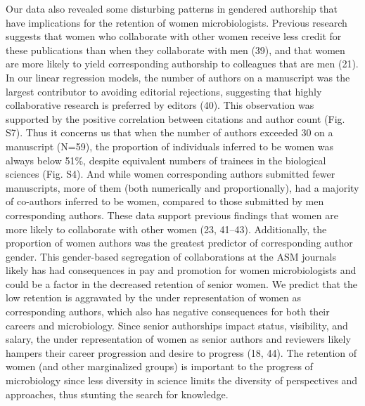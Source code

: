 \documentclass[11pt,]{article}
\begin{document}
Our data also revealed some disturbing patterns in gendered authorship
that have implications for the retention of women microbiologists.
Previous research suggests that women who collaborate with other women
receive less credit for these publications than when they collaborate
with men (39), and that women are more likely to yield corresponding
authorship to colleagues that are men (21). In our linear regression
models, the number of authors on a manuscript was the largest
contributor to avoiding editorial rejections, suggesting that highly
collaborative research is preferred by editors (40). This observation
was supported by the positive correlation between citations and author
count (Fig. S7). Thus it concerns us that when the number of authors
exceeded 30 on a manuscript (N=59), the proportion of individuals
inferred to be women was always below 51\%, despite equivalent numbers
of trainees in the biological sciences (Fig. S4). And while women
corresponding authors submitted fewer manuscripts, more of them (both
numerically and proportionally), had a majority of co-authors inferred
to be women, compared to those submitted by men corresponding authors.
These data support previous findings that women are more likely to
collaborate with other women (23, 41--43). Additionally, the proportion
of women authors was the greatest predictor of corresponding author
gender. This gender-based segregation of collaborations at the ASM
journals likely has had consequences in pay and promotion for women
microbiologists and could be a factor in the decreased retention of
senior women. We predict that the low retention is aggravated by the
under representation of women as corresponding authors, which also has
negative consequences for both their careers and microbiology. Since
senior authorships impact status, visibility, and salary, the under
representation of women as senior authors and reviewers likely hampers
their career progression and desire to progress (18, 44). The retention
of women (and other marginalized groups) is important to the progress of
microbiology since less diversity in science limits the diversity of
perspectives and approaches, thus stunting the search for knowledge.
\end{document}

